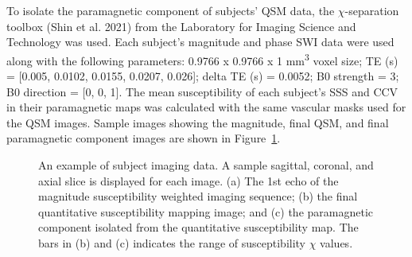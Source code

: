\documentclass[
sn-nature
]{sn-jnl}
\begin{document}
To isolate the paramagnetic component of subjects' QSM data, the
\(\chi\)-separation toolbox (Shin et al. 2021) from the Laboratory for
Imaging Science and Technology was used. Each subject's magnitude and
phase SWI data were used along with the following parameters: 0.9766 x
0.9766 x 1 mm\textsuperscript{3} voxel size; TE (s) = {[}0.005, 0.0102,
0.0155, 0.0207, 0.026{]}; delta TE (s) = 0.0052; B0 strength = 3; B0
direction = {[}0, 0, 1{]}. The mean susceptibility of each subject's SSS
and CCV in their paramagnetic maps was calculated with the same vascular
masks used for the QSM images. Sample images showing the magnitude,
final QSM, and final paramagnetic component images are shown in
Figure~\ref{fig-sample}.

\begin{figure}[H]


\caption{\label{fig-sample}An example of subject imaging data. A sample
sagittal, coronal, and axial slice is displayed for each image. (a) The
1st echo of the magnitude susceptibility weighted imaging sequence; (b)
the final quantitative susceptibility mapping image; and (c) the
paramagnetic component isolated from the quantitative susceptibility
map. The bars in (b) and (c) indicates the range of susceptibility
\(\chi\) values.}

\end{figure}%
\end{document}
